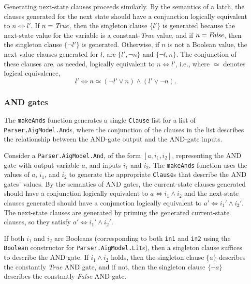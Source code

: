 \documentclass[12pt,a4paper,twoside,openright]{report}
\begin{document}
{Generating next-state clauses proceeds similarly.
By the semantics of a latch, the clauses generated for the next state should have
a conjunction logically equivalent to $n \Leftrightarrow l'$.
If $n = {\it True}$, then the singleton clause
$\{l'\}$ is generated because the next-state value for the variable is a constant-{\it True} value,
and if $n = {\it False}$, then the singleton clause $\{\neg l'\}$ is generated.
Otherwise, if $n$ is not a Boolean value,
the next-value clauses generated for $l$, are $\{l', \neg n\}$
and $\{\neg l, n\}$. The conjunction of these clauses are, as needed, logically equivalent
to $n \Leftrightarrow l'$, i.e., where $\simeq$ denotes logical equivalence,
$$l' \Leftrightarrow n \simeq (\neg l' \vee n) \wedge (l' \vee \neg n).$$

\subsubsection{AND gates}
The \verb,makeAnds, function generates a single \verb,Clause, list for a list of \verb,Parser.AigModel.And,s,
where the conjunction of the clauses in the list describes the relationship between the AND-gate output
and the AND-gate inputs.

Consider a \verb,Parser.AigModel.And,, of the form $[a, i_1, i_2]$, representing the AND gate
with output variable $a$, and inputs $i_1$ and $i_2$.
The \verb,makeAnds, function uses the values of $a$, $i_1$, and $i_2$ to generate the appropriate
\verb,Clause,s that describe the AND gates' values.
By the semantics of AND gates, the current-state clauses generated should have a conjunction
logically equivalent to $a \Leftrightarrow i_1 \wedge i_2$ and the next-state
clauses generated should have a conjunction logically equivalent to
$a' \Leftrightarrow i_1' \wedge i_2'$. The next-state clauses are generated
by priming the generated current-state clauses, so they satisfy
$a' \Leftrightarrow i_1' \wedge i_2'$.

If both $i_1$ and $i_2$ are Booleans (corresponding to both \verb,in1, and \verb,in2, using the \verb,Boolean,
constructor for \verb,Parser.AigModel.Lit,s), then a singleton clause suffices to describe the AND gate.
If $i_1 \wedge i_2$ holds, then the singleton clause $\{a\}$ describes the constantly {\it True} AND gate,
and if not, then the singleton clause $\{\neg a\}$ describes the constantly {\it False} AND gate.

}
\end{document}
